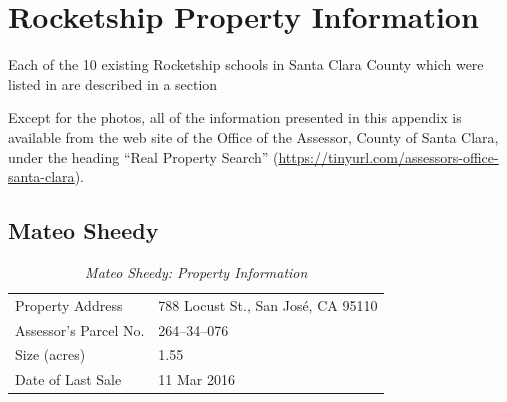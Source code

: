 
\chapter{Rocketship Property Information}\label{ch:rocketship-property-info}\indent
Each of the 10 existing Rocketship schools in Santa Clara County which were listed in  are described in a section

Except for the photos, all of the information presented in this appendix is available from the web site of the Office of the Assessor, County of Santa Clara, under the heading ``Real Property Search'' (\url{https://tinyurl.com/assessors-office-santa-clara}).

\clearpage


\section{Mateo Sheedy}\label{sec:mateo-sheedy-info}\indent

\begin{table}[htb]
  \SingleSpacing%
  \caption[Mateo Sheedy: Property Information]{\textit{Mateo Sheedy: Property Information}}\label{tab:mateo-sheedy-prop-info}
  \begin{tabular}{ll}
    \toprule
    Property Address      & 788 Locust St., San José, CA 95110 \\
    Assessor's Parcel No. &  264–34–076 \\
    Size (acres)          & 1.55 \\
    Date of Last Sale     & 11 Mar 2016 \\
    \bottomrule
  \end{tabular}
\end{table}

